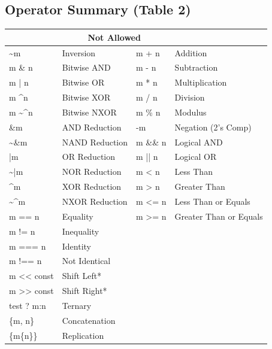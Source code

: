 \documentclass[11pt]{article}
\begin{document}
\begin{samepage}
\subsection*{Operator Summary (Table 2)}
\begin{center}
\renewcommand{\arraystretch}{1.2}
\setlength{\tabcolsep}{10pt}
\begin{tabular}{|>{\ttfamily}p{} p{} | >{\ttfamily}p{} p{}|}
\hline
\multicolumn{2}{|c|}{\textbf{Allowed}} & \multicolumn{2}{c|}{\textbf{Not Allowed}} \\
\hline
\textasciitilde m & Inversion & m + n & Addition \\
m \& n & Bitwise AND & m - n & Subtraction \\
m | n & Bitwise OR & m * n & Multiplication \\
m \textasciicircum n & Bitwise XOR & m / n & Division \\
m \textasciitilde\textasciicircum n & Bitwise NXOR & m \% n & Modulus \\
\&m & AND Reduction & -m & Negation (2's Comp) \\
\textasciitilde\&m & NAND Reduction & m \&\& n & Logical AND \\
|m & OR Reduction & m || n & Logical OR \\
\textasciitilde|m & NOR Reduction & m < n & Less Than \\
\textasciicircum m & XOR Reduction & m > n & Greater Than \\
\textasciitilde\textasciicircum m & NXOR Reduction & m <= n & Less Than or Equals \\
m == n & Equality & m >= n & Greater Than or Equals \\
m != n & Inequality &  &  \\
m === n & Identity &  &  \\
m !== n & Not Identical &  &  \\
m << const & Shift Left* &  &  \\
m >> const & Shift Right* &  &  \\
test ? m:n & Ternary &  &  \\
\{m, n\} & Concatenation &  &  \\
\{m\{n\}\} & Replication &  &  \\
\hline
\end{tabular}
\end{center}
\end{samepage}
\end{document}
